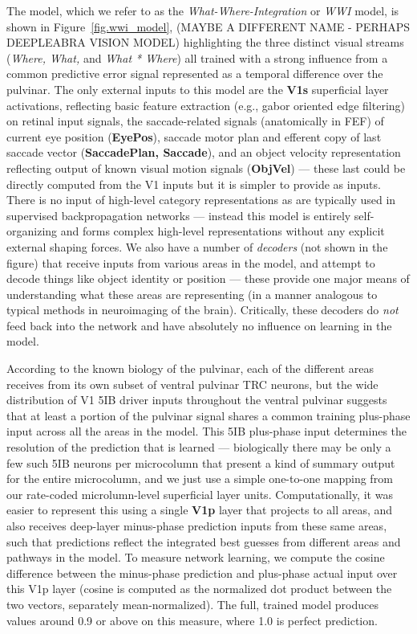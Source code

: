 \documentclass[11pt,twoside]{article}
\newif\myifpdf
\begin{document}
The model, which we refer to as the {\em What-Where-Integration} or {\em WWI} model, is shown in Figure~\ref{fig.wwi_model}, (MAYBE A DIFFERENT NAME - PERHAPS DEEPLEABRA VISION MODEL) highlighting the three distinct visual streams ({\em Where, What,} and {\em What * Where}) all trained with a strong influence from a common predictive error signal represented as a temporal difference over the pulvinar.  The only external inputs to this model are the {\bf V1s} superficial layer activations, reflecting basic feature extraction (e.g., gabor oriented edge filtering) on retinal input signals, the saccade-related signals (anatomically in FEF) of current eye position ({\bf EyePos}), saccade motor plan and efferent copy of last saccade vector ({\bf SaccadePlan, Saccade}), and an object velocity representation reflecting output of known visual motion signals ({\bf ObjVel}) --- these last could be directly computed from the V1 inputs but it is simpler to provide as inputs.  There is no input of high-level category representations as are typically used in supervised backpropagation networks --- instead this model is entirely self-organizing and forms complex high-level representations without any explicit external shaping forces.  We also have a number of {\em decoders} (not shown in the figure) that receive inputs from various areas in the model, and attempt to decode things like object identity or position --- these provide one major means of understanding what these areas are representing (in a manner analogous to typical methods in neuroimaging of the brain).  Critically, these decoders do {\em not} feed back into the network and have absolutely no influence on learning in the model.

According to the known biology of the pulvinar, each of the different areas receives from its own subset of ventral pulvinar TRC neurons, but the wide distribution of V1 5IB driver inputs throughout the ventral pulvinar \cite{Shipp03} suggests that at least a portion of the pulvinar signal shares a common training plus-phase input across all the areas in the model.  This 5IB plus-phase input determines the resolution of the prediction that is learned --- biologically there may be only a few such 5IB neurons per microcolumn that present a kind of summary output for the entire microcolumn, and we just use a simple one-to-one mapping from our rate-coded microlumn-level superficial layer units.  Computationally, it was easier to represent this using a single {\bf V1p} layer that projects to all areas, and also receives deep-layer minus-phase prediction inputs from these same areas, such that predictions reflect the integrated best guesses from different areas and pathways in the model.  To measure network learning, we compute the cosine difference between the minus-phase prediction and plus-phase actual input over this V1p layer (cosine is computed as the normalized dot product between the two vectors, separately mean-normalized).  The full, trained model produces values around 0.9 or above on this measure, where 1.0 is perfect prediction.
\end{document}
